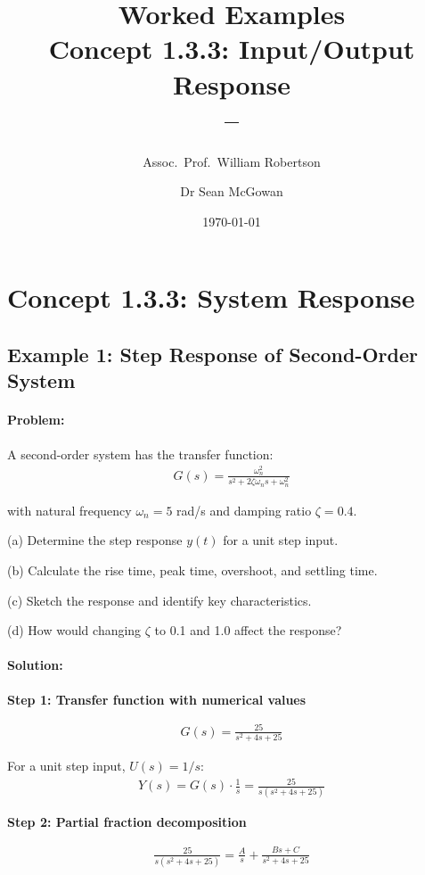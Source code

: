 \documentclass[11pt,a4paper]{article}
\title{\textbf{Worked Examples}\\[0.5em]
\large Concept 1.3.3: Input/Output Response\\[0.3em]
\normalsize \coursesubtitle{} -- \coursetitle}
\author{Assoc.\ Prof.\ William Robertson \and Dr Sean McGowan}
\date{\today}
\begin{document}
\maketitle
\tableofcontents
\newpage

\section{Concept 1.3.3: System Response}

\subsection{Example 1: Step Response of Second-Order System}

\paragraph{Problem:} A second-order system has the transfer function:
\begin{align}
  G(s) = \frac{\omega_n^2}{s^2 + 2\zeta\omega_n s + \omega_n^2}
\end{align}

with natural frequency $\omega_n = 5$ rad/s and damping ratio $\zeta = 0.4$.

(a) Determine the step response $y(t)$ for a unit step input.

(b) Calculate the rise time, peak time, overshoot, and settling time.

(c) Sketch the response and identify key characteristics.

(d) How would changing $\zeta$ to 0.1 and 1.0 affect the response?

\paragraph{Solution:}

\textbf{Step 1: Transfer function with numerical values}

\begin{align}
  G(s) = \frac{25}{s^2 + 4s + 25}
\end{align}

For a unit step input, $U(s) = 1/s$:
\begin{align}
  Y(s) = G(s) \cdot \frac{1}{s} = \frac{25}{s(s^2 + 4s + 25)}
\end{align}

\textbf{Step 2: Partial fraction decomposition}

\begin{align}
  \frac{25}{s(s^2 + 4s + 25)} = \frac{A}{s} + \frac{Bs + C}{s^2 + 4s + 25}
\end{align}
\end{document}
